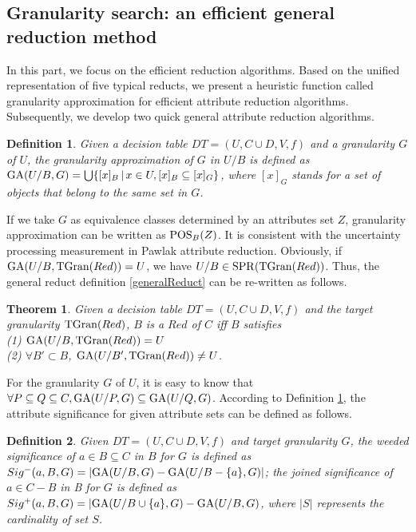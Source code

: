 \documentclass[review]{elsarticle}
\newtheorem{myDef}{Definition}
\newtheorem{myTheo}{Theorem}
\begin{document}
	\subsection{Granularity search: an efficient general reduction method}\label{subsection.gs}
	\par In this part, we focus on the efficient reduction algorithms. Based on the unified representation of five typical reducts, we present a heuristic function called granularity approximation for efficient attribute reduction algorithms. Subsequently, we develop two quick general attribute reduction algorithms. 
	\begin{myDef}\label{granularityApproximation}
		Given a decision table $DT=(U,C\cup D,V,f)$ and a granularity $G$ of $U$, the granularity approximation of $G$ in $U/B$ is defined as ${\rm GA}(U/B,G) = \bigcup \{[x]_B\,|\,x \in U, [x]_B \subseteq [x]_G\}$,	where $[x]_G$ stands for a set of objects that belong to the same set in $G$.
	\end{myDef}
	\noindent If we take $G$ as equivalence classes determined by an attributes set $Z$, granularity approximation can be written as ${\rm POS}_B(Z)$. It is consistent with the uncertainty processing measurement in Pawlak attribute reduction. Obviously, if ${\rm GA}(U/B, {\rm TGran}(Red))=U$, we have $U/B \in {\rm SPR}({\rm TGran}(Red))$. Thus, the general reduct definition \ref{generalReduct} can be re-written as follows.
	\begin{myTheo}
		Given a decision table $DT=(U,C \cup D,V,f)$ and the target granularity ${\rm TGran}(Red)$, $B$ is a $Red$ of $C$ iff $B$ satisfies \\
		{\rm(1)} ${\rm GA}(U/B,{\rm TGran}(Red))=U$\\
		{\rm(2)} $\forall B' \subset B$, ${\rm GA}(U/B',{\rm TGran}(Red)) \neq U$.%
	\end{myTheo}
	\noindent For the granularity $G$ of $U$, it is easy to know that $\forall P \subseteq Q \subseteq C, {\rm GA}(U/P,G) \subseteq {\rm GA}(U/Q,G)$. According to Definition \ref{granularityApproximation}, the attribute significance for given attribute sets can be defined as follows.
	\begin{myDef}
		Given $DT=(U,C \cup D,V,f)$ and target granularity $G$, the weeded significance of $a \in B\subseteq C$ in $B$ for $G$ is defined as
		$Sig^-(a,B,G)=|{\rm GA}(U/B,G)-{\rm GA}(U/B-\{a\},G)|$;	the joined significance of $a \in C-B$ in B for $G$ is defined as
		$Sig^+(a,B,G)=|{\rm GA}(U/B\cup \{a\},G)-{\rm GA}(U/B,G)$, where $|S|$ represents the cardinality of set $S$.
	\end{myDef}
\end{document}

